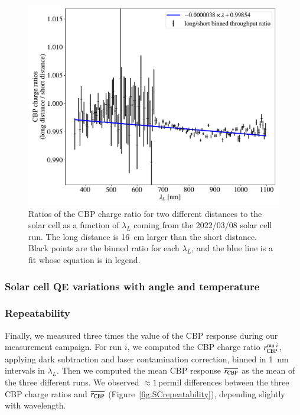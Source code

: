 \begin{figure}[h]
    \centering
    \includegraphics[width=\columnwidth]{fig/sc_distance.pdf}
    \caption{Ratios of the CBP charge ratio for two different distances to the solar cell as a function of $\lambda_L$ coming from the 2022/03/08 solar cell run. The long distance is \SI{16}{\cm} larger than the short distance. Black points are the binned ratio for each $\lambda_L$, and the blue line is a fit whose equation is in legend.}
    \label{fig:sc_distance}
\end{figure}

\subsubsection{Solar cell QE variations with angle and temperature}



\subsubsection{Repeatability}

Finally, we measured three times the value of the CBP response during our measurement campaign. For run $i$, we computed the CBP charge ratio $r_{\rm CBP}^{\mathrm{run}\ i}$, applying dark subtraction and laser contamination correction, binned in \SI{1}{\nm} intervals in $\lambda_L$. Then we computed the mean CBP response $\overline{r_{\rm CBP}}$ as the mean of the three different runs. We observed $\approx 1$\,permil differences between the three CBP charge ratios and $\overline{r_{\rm CBP}}$ (Figure~\ref{fig:SCrepeatability}), depending slightly with wavelength.


